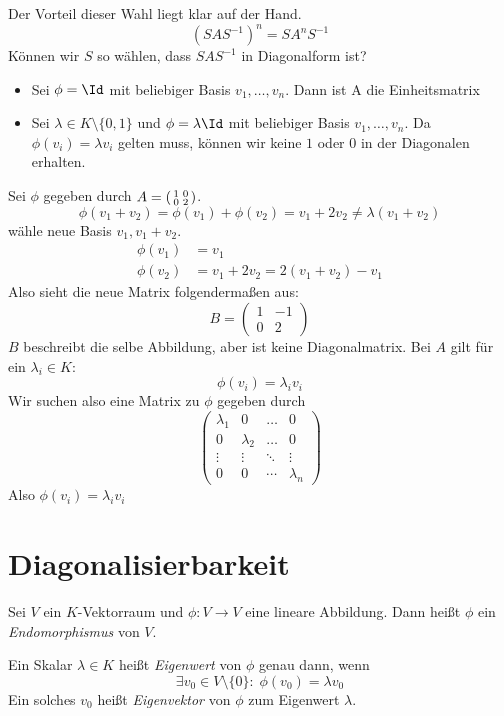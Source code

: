 \documentclass[a4paper, 10pt]{scrbook}
\begin{document}
Der Vorteil dieser Wahl liegt klar auf der Hand.
\[
(SAS^{-1})^n = SA^nS^{-1}
\]
Können wir $S$ so wählen, dass $SAS^{-1}$ in Diagonalform ist?
\begin{ex}
\begin{itemize}
\item Sei $\phi=\Id$ mit beliebiger Basis $v_1,\dotsc,v_n$.
Dann ist A die Einheitsmatrix
\item Sei $\lambda\in K\setminus\{0, 1\}$ und $\phi=\lambda\Id$ mit beliebiger Basis $v_1,\dotsc,v_n$.
Da $\phi(v_i)=\lambda v_i$ gelten muss, können wir keine $1$ oder $0$ in der Diagonalen erhalten.
\end{itemize}
\end{ex}
Sei $\phi$ gegeben durch $A=\begin{psmallmatrix}1&0\\0&2\end{psmallmatrix}$.
\[
\phi(v_1+v_2)=\phi(v_1)+\phi(v_2)=v_1+2v_2\neq\lambda(v_1+v_2)
\]
wähle neue Basis $v_1,v_1+v_2$.
\begin{align*}
\phi(v_1)&=v_1 \\
\phi(v_2)&=v_1+2v_2=2(v_1+v_2)-v_1
\end{align*}
Also sieht die neue Matrix folgendermaßen aus:
\[
B=\begin{pmatrix}1&-1\\0&2\end{pmatrix}
\]
$B$ beschreibt die selbe Abbildung, aber ist keine Diagonalmatrix.
Bei $A$ gilt für ein $\lambda_i\in K$:
\[
\phi(v_i)=\lambda_i v_i
\]
Wir suchen also eine Matrix zu $\phi$ gegeben durch
\[
\begin{pmatrix}\lambda_1&0&\dotsc&0\\0&\lambda_2&\dotsc&0\\\vdots&\vdots&\ddots&\vdots\\0&0&\cdots&\lambda_n\end{pmatrix}
\]
Also $\phi(v_i)=\lambda_i v_i$

\section{Diagonalisierbarkeit}

\begin{df}
\label{df:10.1}
Sei $V$ ein $K$-Vektorraum und $\phi:V\to V$ eine lineare Abbildung.
Dann heißt $\phi$ ein \emph{Endomorphismus} von $V$.

Ein Skalar $\lambda\in K$ heißt \emph{Eigenwert} von $\phi$ genau dann, wenn
\[
\exists v_0\in V\setminus\{0\}:\; \phi(v_0)=\lambda v_0
\]
Ein solches $v_0$ heißt \emph{Eigenvektor} von $\phi$ zum Eigenwert $\lambda$.
\end{df}
\end{document}
